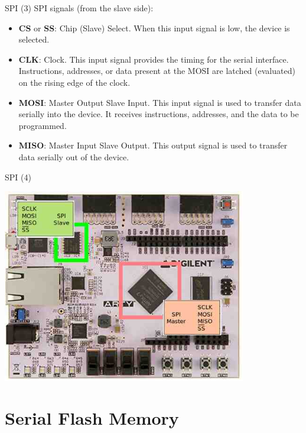 \documentclass[ignorenonframetext,aspectratio=43,]{beamer}
\begin{document}
\begin{frame}{SPI (3) SPI signals (from the slave side):}
\protect\hypertarget{spi-3-spi-signals-from-the-slave-side}{}

\begin{itemize}
\item
  \textbf{CS} or \textbf{SS}: Chip (Slave) Select. When this input
  signal is low, the device is selected.
\item
  \textbf{CLK}: Clock. This input signal provides the timing for the
  serial interface. Instructions, addresses, or data present at the MOSI
  are latched (evaluated) on the rising edge of the clock.
\item
  \textbf{MOSI}: Master Output Slave Input. This input signal is used to
  transfer data serially into the device. It receives instructions,
  addresses, and the data to be programmed.
\item
  \textbf{MISO}: Master Input Slave Output. This output signal is used
  to transfer data serially out of the device.
\end{itemize}

\end{frame}

\begin{frame}{SPI (4)}
\protect\hypertarget{spi-4}{}

\includegraphics[width=0.8\textwidth,height=\textheight]{images/board}

\end{frame}

\hypertarget{serial-flash-memory}{%
\part{Serial Flash Memory}\label{serial-flash-memory}}
\end{document}
